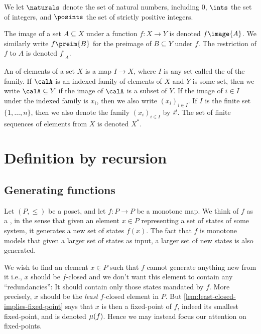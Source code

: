 We let $\naturals$ denote the set of natural numbers, including $0$, $\ints$ the set of integers, and $\posints$ the set of strictly positive integers.

The image of a set $A \subseteq X$ under a function $f \colon X \to Y$ is denoted $f\image{A}$. We similarly write $f\preim{B}$ for the preimage of $B \subseteq Y$ under $f$. The restriction of $f$ to $A$ is denoted $f|_A$.

An  of elements of a set $X$ is a map $I \to X$, where $I$ is any set called the  of the family. If $\calA$ is an indexed family of elements of $X$ and $Y$ is some set, then we write $\calA \subseteq Y$ if the image of $\calA$ is a subset of $Y$. If the image of $i \in I$ under the indexed family is $x_i$, then we also write $(x_i)_{i \in I}$. If $I$ is the finite set $\{1,\ldots,n\}$, then we also denote the family $(x_i)_{i \in I}$ by $\vec{x}$. The set of finite sequences of elements from $X$ is denoted $X^*$.

\clearpage
\section{Definition by recursion}

\subsection{Generating functions}

Let $(P,\leq)$ be a poset, and let $f \colon P \to P$ be a monotone map. We think of $f$ as a , in the sense that given an element $x \in P$ representing a set of states of some system, it generates a new set of states $f(x)$. The fact that $f$ is monotone models that given a larger set of states as input, a larger set of new states is also generated.

We wish to find an element $x \in P$ such that $f$ cannot generate anything new from it \textdash i.e., $x$ should be $f$-closed \textdash and we don't want this element to contain any \enquote{redundancies}: It should contain only those states mandated by $f$. More precisely, $x$ should be the \emph{least} $f$-closed element in $P$. But \cref{lem:least-closed-implies-fixed-point} says that $x$ is then a fixed-point of $f$, indeed its smallest fixed-point, and is denoted $\lfp{f}$. Hence we may instead focus our attention on fixed-points.

